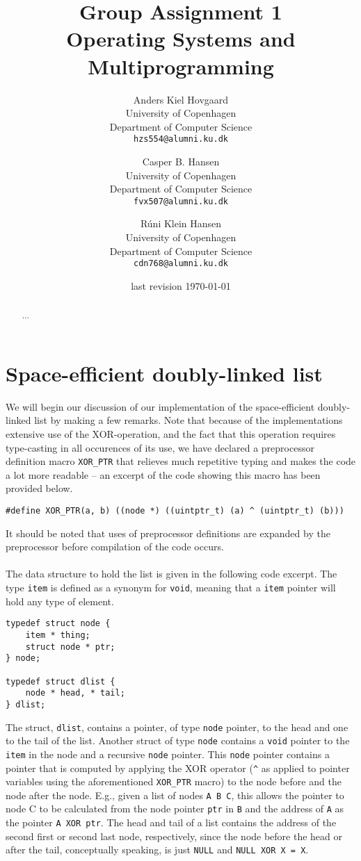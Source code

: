 \documentclass[11pt]{article}
\title
{
    {\Large Group Assignment 1} \\
    Operating Systems and Multiprogramming
}
\author
{
    Anders Kiel Hovgaard \\
    University of Copenhagen \\
    Department of Computer Science \\
    {\tt hzs554@alumni.ku.dk}
    \and
    Casper B. Hansen \\
    University of Copenhagen \\
    Department of Computer Science \\
    {\tt fvx507@alumni.ku.dk}
    \and
    Rúni Klein Hansen \\
    University of Copenhagen \\
    Department of Computer Science \\
    {\tt cdn768@alumni.ku.dk}
}
\date{last revision \today}
\newcommand{\code}[1]{{\tt #1}}
\begin{document}
\clearpage
\maketitle
\thispagestyle{empty}
\begin{multicols}{2}
    \begin{abstract}
    ...
    \end{abstract}
    \vfill\columnbreak
    \tableofcontents\vfill
\end{multicols}
\newpage

\section{Space-efficient doubly-linked list}
We will begin our discussion of our implementation of the space-efficient
doubly-linked list by making a few remarks. Note that because of the
implementations extensive use of the XOR-operation, and the fact that this
operation requires type-casting in all occurences of its use, we have declared
a preprocessor definition macro \code{XOR\_PTR} that relieves much repetitive
typing and makes the code a lot more readable -- an excerpt of the code
showing this macro has been provided below.

\begin{lstlisting}
#define XOR_PTR(a, b) ((node *) ((uintptr_t) (a) ^ (uintptr_t) (b)))
\end{lstlisting}

It should be noted that uses of preprocessor definitions are expanded by the
preprocessor before compilation of the code occurs.\\
\\
The data structure to hold the list is given in the following code excerpt. The
type \code{item} is defined as a synonym for \code{void}, meaning that a
\code{item} pointer will hold any type of element.
\begin{lstlisting}
typedef struct node {
    item * thing;
    struct node * ptr;
} node;

typedef struct dlist {
    node * head, * tail;
} dlist;
\end{lstlisting}
The struct, \code{dlist}, contains a pointer, of type \code{node} pointer, to the
head and one to the tail of the list. Another struct of type \code{node} contains
a \code{void} pointer to the \code{item} in the node and a recursive \code{node}
pointer. This \code{node} pointer contains a pointer that is computed by
applying the XOR operator (\lstinline{^} as applied to pointer variables using
the aforementioned \lstinline{XOR_PTR} macro) to the node before and the node
after the node. E.g., given a list of nodes \verb|A B C|, this allows the pointer to
node C to be calculated from the node pointer \code{ptr} in \verb|B| and the
address of \verb|A| as the pointer \code{A XOR ptr}. The head and tail of a list
contains the address of the second first or second last node, respectively,
since the node before the head or after the tail, conceptually speaking, is just
\code{NULL} and \code{NULL XOR X = X}.
\end{document}

